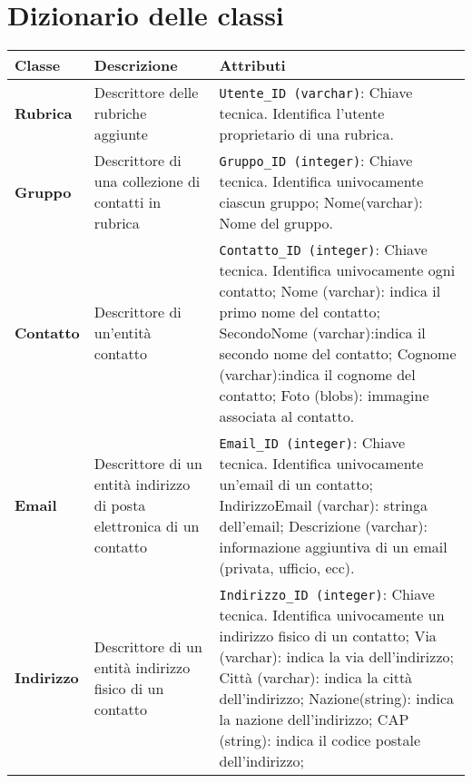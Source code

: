 \section{Dizionario delle classi}
\begin{longtable}{p{}p{}p{}}
\toprule
Classe & Descrizione & Attributi                                                                                                                         
\\ \midrule
\endhead
\textbf{Rubrica} &
Descrittore delle rubriche aggiunte &
\verb|Utente_ID (varchar)|: Chiave tecnica. Identifica l’utente proprietario di una rubrica. 
\\ \midrule
\textbf{Gruppo} &
Descrittore di una collezione di contatti in rubrica &
\verb|Gruppo_ID (integer)|: Chiave tecnica. Identifica univocamente ciascun gruppo;\newline
Nome(varchar): Nome del gruppo.
\\ \midrule
\textbf{Contatto} &
Descrittore di un'entità contatto &
\verb|Contatto_ID (integer)|: Chiave tecnica. Identifica univocamente ogni contatto;\newline
Nome (varchar): indica il primo nome del contatto;\newline
SecondoNome (varchar):indica il secondo nome del contatto;\newline
Cognome (varchar):indica il cognome del contatto;\newline
Foto (blobs): immagine associata al contatto.
\\ \midrule
\textbf{Email} &
Descrittore di un entità indirizzo di posta elettronica di un contatto &
\verb|Email_ID (integer)|: Chiave tecnica. Identifica univocamente un'email di un contatto;\newline
IndirizzoEmail (varchar): stringa dell'email;\newline
Descrizione (varchar): informazione aggiuntiva di un email (privata, ufficio, ecc).
\\ \midrule
\textbf{Indirizzo} &
Descrittore di un entità indirizzo fisico di un contatto &
\verb|Indirizzo_ID (integer)|: Chiave tecnica. Identifica univocamente un indirizzo fisico di un contatto; \newline
Via (varchar): indica la via dell’indirizzo;\newline
Città (varchar): indica la città dell’indirizzo;\newline
Nazione(string): indica la nazione dell’indirizzo;\newline
CAP (string): indica il codice postale dell'indirizzo;\newline

\end{longtable}
